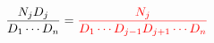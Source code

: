 \documentclass[10pt]{article}
\begin{document}
\begin{eqnarray} \nonumber
\frac{N_jD_j}{D_1 \cdots D_n}
=
\textcolor{red}{
\frac{N_j}{D_1 \cdots D_{j-1} D_{j+1} \cdots D_{n}}
}
\end{eqnarray}
\end{document}
